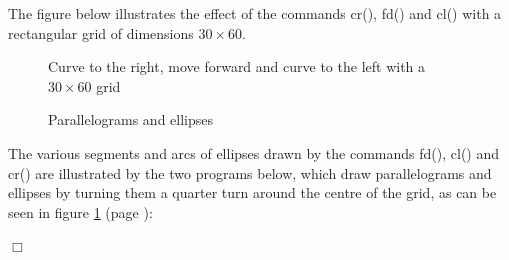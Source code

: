  The figure
 below
illustrates the effect of the commands
 {\idt cr()}, {\idt fd()} and {\idt cl()} with a rectangular grid of dimensions $30 \times 60$.
\begin{figure}[htbp]
 \caption{Curve to the right, move forward and curve to the left with a $30 \times 60$ grid}
\end{figure}
\begin{figure}[htbp]
 \caption{Parallelograms and ellipses}
 \label{fig:parel}
\end{figure}
\begin{exemple}{\rm
\renewcommand{\carrenoir}{\hspace{-4mm}\rule{1.5mm}{1.5mm}\hspace{2.5mm}}
The various segments and arcs of el\-lip\-ses drawn by the commands {\idt fd()}, {\idt cl()}
and {\idt cr()} are illustrated by the two programs below, which draw parallelograms and
ellipses by turning them a quarter turn around the centre of the grid, as can be seen in
fig\-ure \ref{fig:parel} (page \pageref{fig:parel}):\hfill


\renewcommand{\carrenoir}{}
\noindent $\Box$}\end{exemple}

